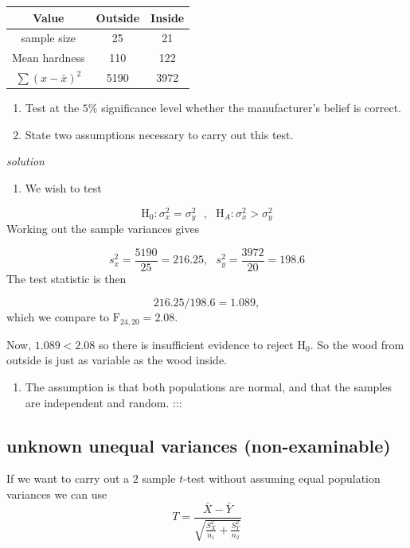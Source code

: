 \documentclass[
]{book}
\providecommand{\tightlist}{%
  \setlength{\itemsep}{0pt}\setlength{\parskip}{0pt}}
\theoremstyle{definition}
\theoremstyle{definition}
\theoremstyle{definition}
\theoremstyle{definition}
\theoremstyle{remark}
\begin{document}
\begin{longtable}[]{@{}ccc@{}}
\toprule
Value & Outside & Inside\tabularnewline
\midrule
\endhead
sample size & 25 & 21\tabularnewline
Mean hardness & 110 & 122\tabularnewline
\(\sum(x-\bar{x})^2\) & 5190 & 3972\tabularnewline
\bottomrule
\end{longtable}

\begin{enumerate}
\def\labelenumi{\alph{enumi})}
\item
  Test at the \(5\%\) significance level whether the manufacturer's belief is correct.
\item
  State two assumptions necessary to carry out this test.
\end{enumerate}

\emph{solution}

\begin{enumerate}
\def\labelenumi{\alph{enumi})}
\tightlist
\item
  We wish to test
\end{enumerate}

\[\text{H}_0: \sigma^2_x=\sigma^2_y \ \ \ , \ \ \ \text{H}_A: \sigma^2_x>\sigma^2_y\]
Working out the sample variances gives

\[s^2_x = \frac{5190}{25}=216.25, \ \ \ s^2_y = \frac{3972}{20} = 198.6\]
The test statistic is then

\[216.25/198.6 = 1.089,\]
which we compare to \(\text{F}_{24,20} = 2.08\).

Now, \(1.089 < 2.08\) so there is insufficient evidence to reject \(\text{H}_0\). So the wood from outside is just as variable as the wood inside.

\begin{enumerate}
\def\labelenumi{\alph{enumi})}
\setcounter{enumi}{1}
\tightlist
\item
  The assumption is that both populations are normal, and that the samples are independent and random.
  :::
\end{enumerate}

\hypertarget{unknown-unequal-variances-non-examinable}{%
\subsection{unknown unequal variances (non-examinable)}\label{unknown-unequal-variances-non-examinable}}

If we want to carry out a \(2\) sample \(t\)-test without assuming equal population variances we can use \[T = \frac{\bar{X} - \bar{Y}}{\sqrt{\frac{S_X^2}{n_1} + \frac{S_Y^2}{n_2}}}\]
\end{document}
